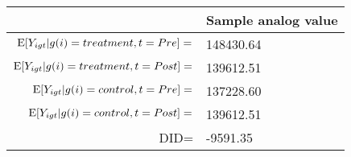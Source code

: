 \begin{tabular}{rl}
\toprule
 & Sample analog value \\
\midrule
$\text{E}[Y_{igt}|g(i)=treatment,t=Pre]=$ & 148430.64 \\
$\text{E}[Y_{igt}|g(i)=treatment,t=Post]=$ & 139612.51 \\
$\text{E}[Y_{igt}|g(i)=control,t=Pre]=$ & 137228.60 \\
$\text{E}[Y_{igt}|g(i)=control,t=Post]=$ & 139612.51 \\
\midrule DID= & -9591.35 \\
\bottomrule
\end{tabular}

